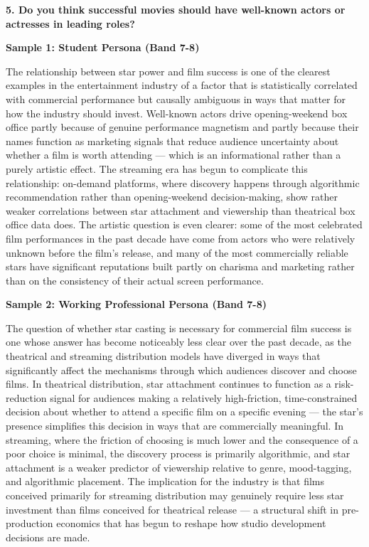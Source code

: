 \separator

\begin{ieltsquestion}
\textbf{5. Do you think successful movies should have well-known actors or actresses in leading roles?}
\end{ieltsquestion}
\textbf{Sample 1: Student Persona (Band 7-8)}

The relationship between star power and film success is one of the clearest examples in the entertainment industry of a factor that is statistically correlated with commercial performance but causally ambiguous in ways that matter for how the industry should invest. Well-known actors drive opening-weekend box office partly because of genuine performance magnetism and partly because their names function as marketing signals that reduce audience uncertainty about whether a film is worth attending — which is an informational rather than a purely artistic effect. The streaming era has begun to complicate this relationship: on-demand platforms, where discovery happens through algorithmic recommendation rather than opening-weekend decision-making, show rather weaker correlations between star attachment and viewership than theatrical box office data does. The artistic question is even clearer: some of the most celebrated film performances in the past decade have come from actors who were relatively unknown before the film's release, and many of the most commercially reliable stars have significant reputations built partly on charisma and marketing rather than on the consistency of their actual screen performance.

\textbf{Sample 2: Working Professional Persona (Band 7-8)}

The question of whether star casting is necessary for commercial film success is one whose answer has become noticeably less clear over the past decade, as the theatrical and streaming distribution models have diverged in ways that significantly affect the mechanisms through which audiences discover and choose films. In theatrical distribution, star attachment continues to function as a risk-reduction signal for audiences making a relatively high-friction, time-constrained decision about whether to attend a specific film on a specific evening — the star's presence simplifies this decision in ways that are commercially meaningful. In streaming, where the friction of choosing is much lower and the consequence of a poor choice is minimal, the discovery process is primarily algorithmic, and star attachment is a weaker predictor of viewership relative to genre, mood-tagging, and algorithmic placement. The implication for the industry is that films conceived primarily for streaming distribution may genuinely require less star investment than films conceived for theatrical release — a structural shift in pre-production economics that has begun to reshape how studio development decisions are made.

